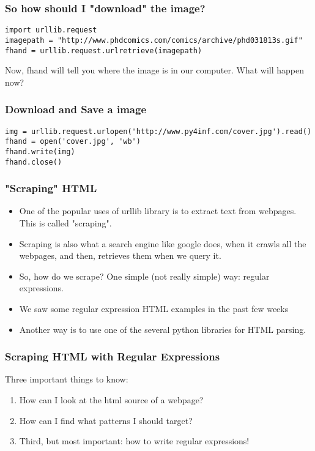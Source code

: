 \documentclass{beamer}
\begin{document}
\begin{frame}[fragile]
\frametitle{So how should I "download" the image?}
\scriptsize
\begin{verbatim}
import urllib.request
imagepath = "http://www.phdcomics.com/comics/archive/phd031813s.gif"
fhand = urllib.request.urlretrieve(imagepath)
\end{verbatim}
Now, fhand will tell you where the image is in our computer.
What will happen now?
\end{frame}

\begin{frame}[fragile]
\frametitle{Download and Save a image}
\footnotesize
\begin{verbatim}
img = urllib.request.urlopen('http://www.py4inf.com/cover.jpg').read()
fhand = open('cover.jpg', 'wb')
fhand.write(img)
fhand.close()
\end{verbatim}
\end{frame}

\begin{frame}
\frametitle{"Scraping" HTML}
\begin{itemize}
\item One of the popular uses of urllib library is to extract text from webpages. This is called "scraping".
\item Scraping is also what a search engine like google does, when it crawls all the webpages, and then, retrieves them when we query it.
\item So, how do we scrape? One simple (not really simple) way: regular expressions. \pause
\item We saw some regular expression HTML examples in the past few weeks \pause
\item Another way is to use one of the several python libraries for HTML parsing.
\end{itemize}
\end{frame}

\begin{frame}
\frametitle{Scraping HTML with Regular Expressions}
Three important things to know:
\begin{enumerate}
\item How can I look at the html source of a webpage? \pause
\item How can I find what patterns I should target? \pause
\item Third, but most important: how to write regular expressions!
\end{enumerate}
\end{frame}
\end{document}
